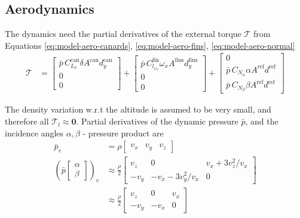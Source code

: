 \subsection{Aerodynamics}
The dynamics need the partial derivatives of the external torque $\mathcal{T}$ from Equations \ref{eq:model-aero-canards}, \ref{eq:model-aero-fins}, \ref{eq:model-aero-normal}
\begin{align}
    \mathcal{T} &=
    \begin{bmatrix} \bar p \, C^\text{can}_{L_\delta} \delta A^\text{can} d^\text{can}_y \\ 0 \\ 0 \end{bmatrix} 
    + 
    \begin{bmatrix} \bar p \, C^\text{fin}_{l_{\omega_x}} \omega_x A^\text{fins} d^\text{fins}_y \\ 0 \\ 0 \end{bmatrix} 
    +
    \begin{bmatrix} 
    0 \\
    \bar p \, C_{N_\alpha} \alpha A^\text{ref} d^\text{ref} \\
    \bar p \, C_{N_\beta} \beta A^\text{ref} d^\text{ref}
    \end{bmatrix} 
\end{align}

The density variation w.r.t the altitude is assumed to be very small, and therefore all $\mathcal{T}_l \approx \bm 0$. 
Partial derivatives of the dynamic pressure $\bar p$, and the incidence angles $\alpha, \beta$ - pressure product are
\begin{align}
    \bar p_v &= \rho \begin{bmatrix}
        v_x & v_y & v_z
    \end{bmatrix} 
    \\
    (\bar p \begin{bmatrix}\alpha \\ \beta\end{bmatrix})_v &\approx \frac{\rho}{2} 
    \begin{bmatrix}
        v_z & 0 & v_x + 3v_z^2/v_x \\
        - v_y & -v_x - 3v_y^2/v_x & 0 
    \end{bmatrix}
    \\
    &\approx
    \frac{\rho}{2} 
    \begin{bmatrix}
        v_z & 0 & v_x \\
        -v_y & -v_x & 0 
    \end{bmatrix}
\end{align}

